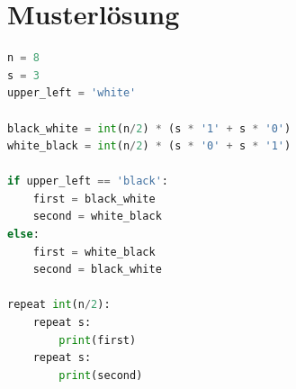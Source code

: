 \clearpage
\section*{Musterlösung}
\begin{lstlisting}[language=Python]
n = 8
s = 3
upper_left = 'white'

black_white = int(n/2) * (s * '1' + s * '0')
white_black = int(n/2) * (s * '0' + s * '1')

if upper_left == 'black':
    first = black_white
    second = white_black
else:
    first = white_black
    second = black_white

repeat int(n/2):
    repeat s:
        print(first)
    repeat s:
        print(second)
\end{lstlisting}

